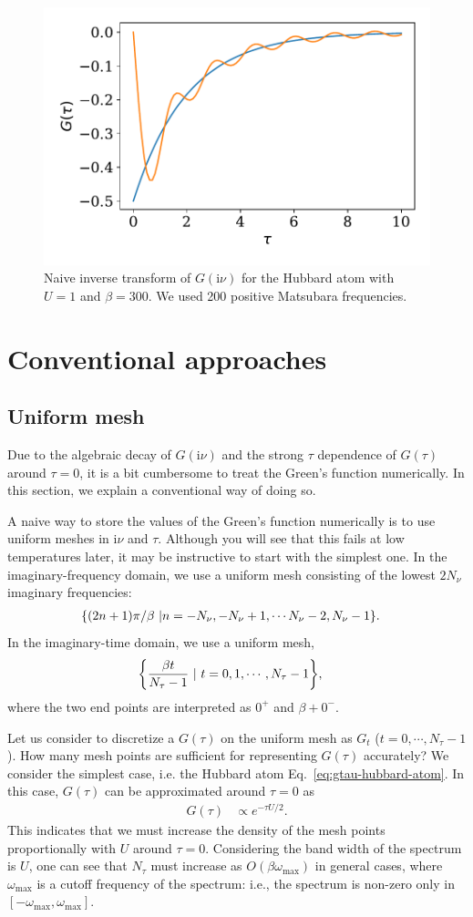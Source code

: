 \documentclass[submission, LectureNotes]{SciPost}
\newcommand{\wmax}{\ensuremath{{\omega_\mathrm{max}}}}
\newcommand\ii{\mathrm{i}}%
\newcommand\iv{\ii\nu}%
\begin{document}
\begin{figure}
    \centering
    \includegraphics[width=0.5\columnwidth]{naive_inverse_transform_hubbard_atom.pdf}
    \caption{Naive inverse transform of $G(\iv)$ for the Hubbard atom with $U=1$ and $\beta=300$. We used 200 positive Matsubara frequencies.}
    \label{fig:naive-inverse-transform-hubbard-atom}
\end{figure}


\section{Conventional approaches}
\subsection{Uniform mesh}
Due to the algebraic decay of $G(\iv)$ and the strong $\tau$ dependence of $G(\tau)$ around $\tau=0$,
it is a bit cumbersome to treat the Green's function numerically.
In this section, we explain a conventional way of doing so.

A naive way to store the values of the Green's function numerically is to use uniform meshes in $\iv$ and $\tau$.
Although you will see that this fails at low temperatures later,
it may be instructive to start with the simplest one.
In the imaginary-frequency domain, we use a uniform mesh consisting of the lowest $2N_\nu$ imaginary frequencies:
\begin{align}
&\qty{(2n+1)\pi/\beta~| n=-N_\nu, -N_\nu+1, \cdots N_\nu-2, N_\nu-1}.
\end{align}
In the imaginary-time domain, we use a uniform mesh,
\begin{align}
&\qty{\frac{\beta t}{N_\tau-1}~|~t=0, 1, \cdots, N_\tau-1},
\end{align}
where the two end points are interpreted as $0^+$ and $\beta + 0^-$.

Let us consider to discretize a $G(\tau)$ on the uniform mesh as $G_t$ ($t=0, \cdots, N_\tau-1$).
How many mesh points are sufficient for representing $G(\tau)$ accurately?
We consider the simplest case, i.e. the Hubbard atom Eq.~\eqref{eq:gtau-hubbard-atom}.
In this case, $G(\tau)$ can be approximated around $\tau=0$ as
\begin{align}
    G(\tau) &\propto e^{-\tau U/2}.
\end{align}
This indicates that we must increase the density of the mesh points proportionally with $U$ around $\tau=0$.
Considering the band width of the spectrum is $U$, one can see that $N_\tau$ must increase as $O(\beta \wmax)$ in general cases,
where $\wmax$ is a cutoff frequency of the spectrum: i.e., the spectrum is non-zero only in $[-\wmax, \wmax]$.
\end{document}

